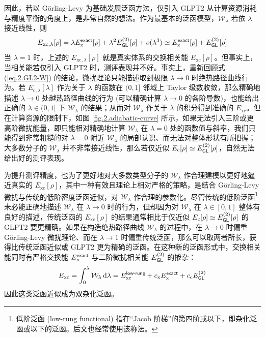 因此，若以 G\"orling-Levy 为基础发展泛函方法，仅引入 GLPT2 从计算资源消耗与精度平衡的角度上，是非常自然的想法。作为最基本的泛函模型，$\mathcal{W}_{\lambda}$ 若依 $\lambda$ 接近线性，则
\begin{equation}
  E_{\mathrm{xc}, \lambda} [\rho] = \lambda E_\mathrm{x}^{\textsf{exact}}[\rho] + \lambda^2 E_{\textsf{GL}}^{(2)} [\rho] + o(\lambda^3) \simeq E_\mathrm{x}^{\textsf{exact}}[\rho] + E_{\textsf{GL}}^{(2)} [\rho]
\end{equation}
当 $\lambda = 1$ 时，上述的 $E_{\mathrm{xc}, \lambda} [\rho]$ 就是真实体系的交换相关能 $E_{\mathrm{xc}} [\rho]$。但事实上，当相关能若仅引入 GLPT2 时，测评表现并不好\cite{Su-Xu.JCP.2014}。事实上，重新回顾式 (\ref{eq.2.GL2-W}) 的结论，微扰理论只能描述取到极限 $\lambda \rightarrow 0$ 时绝热路径曲线行为。若 $E_{\mathrm{c}, \lambda} [\lambda]$ 作为关于 $\lambda$ 的函数在 $(0, 1]$ 邻域上 Taylor 级数收敛，那么精确地描述 $\lambda \rightarrow 0$ 处越热路径曲线的行为 (可以精确计算 $\lambda \rightarrow 0$ 的各阶导数)，也能给出正确的 $\lambda \in (0, 1]$ 下 $\mathcal{W}_{\lambda}$ 的结果；从而对 $\mathcal{W}_{\lambda}$ 作关于 $\lambda$ 的积分得到准确的 $E_\mathrm{xc}$。但在计算资源的限制下，如图 \ref{fig.2.adiabatic-curve} 所示，如果无法引入三阶或更高阶微扰能量，即只能相对精确地计算 $\mathcal{W}_{\lambda}$ 在 $\lambda = 0$ 处的函数值与斜率，我们只能得到非常粗糙的对 $\lambda = 0$ 附近 $\mathcal{W}_{\lambda}$ 的局部认识、而无法对整体形状有所把握；大多数分子的 $\mathcal{W}_{\lambda}$ 并不非常接近线性，那么若仅近似 $E_\mathrm{c} [\rho] \simeq E_{\textsf{GL}}^{(2)} [\rho]$，自然无法给出好的测评表现。

为提升测评精度，也为了更好地对大多数类型分子的 $\mathcal{W}_{\lambda}$ 作合理建模以更好地逼近真实的 $E_\mathrm{xc} [\rho]$，其中一种有效且理论上相对严格的策略，是结合 G\"orling-Levy 微扰与传统的低阶密度泛函近似，对 $\mathcal{W}_{\lambda}$ 作合理的参数化。尽管传统的低阶泛函\footnote{低阶泛函 (low-rung functional) 指在“Jacob 阶梯”的第四阶或以下，即杂化泛函或以下的泛函。后文也经常使用该称法。}未必能正确地描述 $\mathcal{W}_{\lambda}$ 在 $\lambda \rightarrow 0$ 时的行为，但却因为对 $\mathcal{W}_{\lambda}$ 在 $\lambda \in [0, 1]$ 整体有良好的描述，传统泛函的 $E_\mathrm{xc} [\rho]$ 的结果通常相比于仅近似 $E_\mathrm{c} [\rho] \simeq E_{\textsf{GL}}^{(2)} [\rho]$ 的 GLPT2 要更精确。如果在构造绝热路径曲线 $\mathcal{W}_{\lambda}$ 的过程中，在 $\lambda \rightarrow 0$ 时偏重 G\"orling-Levy 微扰理论、而在 $\lambda \rightarrow 1$ 时偏重传统泛函，那么可以取两者所长，获得比传统泛函近似或 GLPT2 更为精确的泛函。在这种新的泛函形式中，交换相关能同时有严格交换能 $E_\mathrm{x}^{\textsf{exact}}$ 与二阶微扰相关能 $E_{\textsf{GL}}^{(2)}$ 的掺杂：
\begin{equation}
  E_\mathrm{xc} = \int_0^\lambda \mathcal{W}_{\lambda} \, \mathrm{d} \lambda = E_\mathrm{xc}^{\textsf{low-rung}} + c_\mathrm{x} E_\mathrm{x}^{\textsf{exact}} + c_\mathrm{c} E_{\textsf{GL}}^{(2)}
\end{equation}
因此这类泛函近似成为双杂化泛函。

